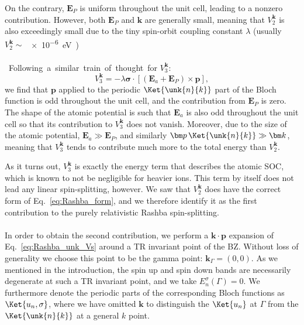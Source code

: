 On the contrary, $\bm E_P$ is uniform throughout the unit cell, leading to a nonzero contribution.
However, both $\bm E_P$ and $\bm k$ are generally small, meaning that $V^{\bm k}_2$ is also exceedingly small due to the tiny spin-orbit coupling constant $\lambda$ (usually $V^{\bm k}_2 \sim$ \SI{e-6}eV).
\\\\
Following a similar train of thought for $V^{\bm k}_3$:
\begin{equation}
	V^{\bm k}_3 = -\lambda \bm{\sigma} \cdot \left[ (\bm E_a + \bm E_P) \times \bm{p}\right],
\end{equation}
we find that $\bm p$ applied to the periodic $\Ket{\unk{n}{k}}$ part of the Bloch function is odd throughout the unit cell, and the contribution from $\bm E_P$ is zero.
The shape of the atomic potential is such that $\bm E_a$ is also odd throughout the unit cell so that its contribution to $V^{\bm k}_3$ does not vanish.
Moreover, due to the size of the atomic potential, $\bm E_a \gg \bm E_P$, and similarly $\bm p\,\Ket{\unk{n}{k}} \gg \bm k$, meaning that $V^{\bm k}_3$ tends to contribute much more to the total energy than $V^{\bm k}_2$.

As it turns out, $V^{\bm k}_3$ is exactly the energy term that describes the atomic SOC, which is known to not be negligible for heavier ions.
This term by itself does not lead any linear spin-splitting, however.
We saw that $V_2^{\bm k}$ does have the correct form of Eq.~\eqref{eq:Rashba_form}, and we therefore identify it as the first contribution to the purely relativistic Rashba spin-splitting.
\\\\
In order to obtain the second contribution, we perform a $\bm k \cdot \bm p$ expansion of Eq.~\eqref{eq:Rashba_unk_Vs} around a TR invariant point of the BZ.
Without loss of generality we choose this point to be the gamma point: $\bm{k}_\Gamma = (0, 0)$.
As we mentioned in the introduction, the spin up and spin down bands are necessarily degenerate at such a TR invariant point, and we take $E^{\sigma}_n(\Gamma) = 0$.
We furthermore denote the periodic parts of the corresponding Bloch functions as $\Ket{u_n, \sigma}$, where we have omitted $\bm k$ to distinguish the $\Ket{u_n}$ at $\Gamma$ from the $\Ket{\unk{n}{k}}$ at a general $k$ point.

